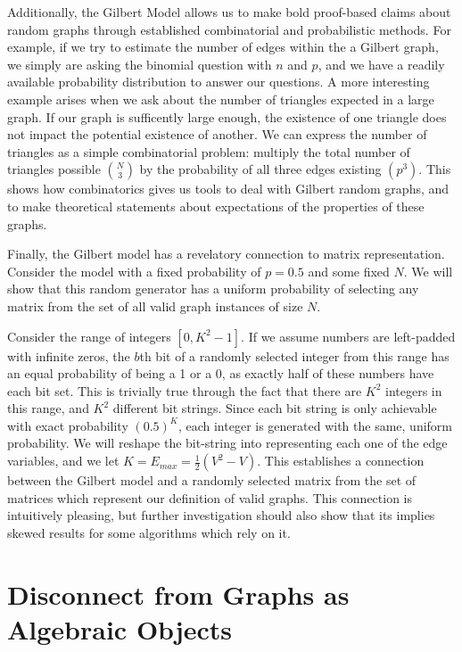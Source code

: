 \documentclass[11pt,a4paper]{report}
\begin{document}
Additionally, the Gilbert Model allows us to make bold proof-based claims about random graphs through established combinatorial and probabilistic methods.
For example, if we try to estimate the number of edges within the a Gilbert graph, we simply are asking the binomial question with $n$ and $p$, and we have a readily available probability distribution to answer our questions.
A more interesting example arises when we ask about the number of triangles expected in a large graph.
If our graph is sufficently large enough, the existence of one triangle does not impact the potential existence of another.
We can express the number of triangles as a simple combinatorial problem: multiply the total number of triangles possible $\binom{N}{3}$ by the probability of all three edges existing $(p^3)$.
This shows how combinatorics gives us tools to deal with Gilbert random graphs, and to make theoretical statements about expectations of the properties of these graphs.

Finally, the Gilbert model has a revelatory connection to matrix representation.
Consider the model with a fixed probability of $p=0.5$ and some fixed $N$.
We will show that this random generator has a uniform probability of selecting any matrix from the set of all valid graph instances of size $N$.

Consider the range of integers $[0, K^2 - 1]$.
If we assume numbers are left-padded with infinite zeros, the $b$th bit of a randomly selected integer from this range has an equal probability of being a 1 or a 0, as exactly half of these numbers have each bit set.
This is trivially true through the fact that there are $K^2$ integers in this range, and $K^2$ different bit strings.
Since each bit string is only achievable with exact probability $(0.5)^K$, each integer is generated with the same, uniform probability.
We will reshape the bit-string into representing each one of the edge variables, and we let $K = E_{max} = \frac{1}{2}(V^2 - V)$.
This establishes a connection between the Gilbert model and a randomly selected matrix from the set of matrices which represent our definition of valid graphs. 
This connection is intuitively pleasing, but further investigation should also show that its implies skewed results for some algorithms which rely on it.

\section{Disconnect from Graphs as Algebraic Objects}
\end{document}
